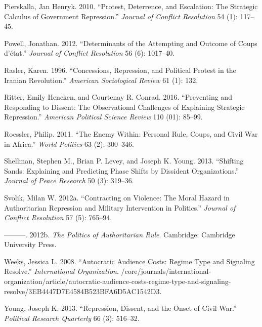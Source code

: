 \documentclass[12pt,]{article}
\theoremstyle{definition}
\theoremstyle{definition}
\theoremstyle{definition}
\theoremstyle{remark}
\begin{document}
\leavevmode\hypertarget{ref-Pierskalla2010}{}%
Pierskalla, Jan Henryk. 2010. ``Protest, Deterrence, and Escalation: The
Strategic Calculus of Government Repression.'' \emph{Journal of Conflict
Resolution} 54 (1): 117--45.

\leavevmode\hypertarget{ref-Powell2012a}{}%
Powell, Jonathan. 2012. ``Determinants of the Attempting and Outcome of
Coups d'état.'' \emph{Journal of Conflict Resolution} 56 (6): 1017--40.

\leavevmode\hypertarget{ref-Rasler1996}{}%
Rasler, Karen. 1996. ``Concessions, Repression, and Political Protest in
the Iranian Revolution.'' \emph{American Sociological Review} 61 (1):
132.

\leavevmode\hypertarget{ref-Ritter2016}{}%
Ritter, Emily Hencken, and Courtenay R. Conrad. 2016. ``Preventing and
Responding to Dissent: The Observational Challenges of Explaining
Strategic Repression.'' \emph{American Political Science Review} 110
(01): 85--99.

\leavevmode\hypertarget{ref-Roessler2011}{}%
Roessler, Philip. 2011. ``The Enemy Within: Personal Rule, Coups, and
Civil War in Africa.'' \emph{World Politics} 63 (2): 300--346.

\leavevmode\hypertarget{ref-Shellman2013}{}%
Shellman, Stephen M., Brian P. Levey, and Joseph K. Young. 2013.
``Shifting Sands: Explaining and Predicting Phase Shifts by Dissident
Organizations.'' \emph{Journal of Peace Research} 50 (3): 319--36.

\leavevmode\hypertarget{ref-Svolik2012e}{}%
Svolik, Milan W. 2012a. ``Contracting on Violence: The Moral Hazard in
Authoritarian Repression and Military Intervention in Politics.''
\emph{Journal of Conflict Resolution} 57 (5): 765--94.

\leavevmode\hypertarget{ref-Svolik2012d}{}%
---------. 2012b. \emph{The Politics of Authoritarian Rule}. Cambridge:
Cambridge University Press.

\leavevmode\hypertarget{ref-Weeks2008}{}%
Weeks, Jessica L. 2008. ``Autocratic Audience Costs: Regime Type and
Signaling Resolve.'' \emph{International Organization}.
/core/journals/international-organization/article/autocratic-audience-costs-regime-type-and-signaling-resolve/3EB4447D7E4584B523BFA6D5AC1542D3.

\leavevmode\hypertarget{ref-Young2013}{}%
Young, Joseph K. 2013. ``Repression, Dissent, and the Onset of Civil
War.'' \emph{Political Research Quarterly} 66 (3): 516--32.
\end{document}
